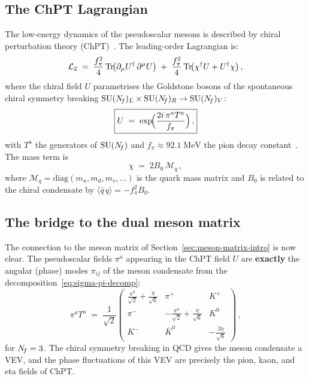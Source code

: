 \documentclass[11pt,a4paper]{article}
\newcommand{\fpi}{f_\pi}
\newcommand{\qqbar}{\langle \bar{q}\,q \rangle}
\newcommand{\ChPT}{\ensuremath{\mathrm{ChPT}}}
\begin{document}
\subsection{The ChPT Lagrangian}

The low-energy dynamics of the pseudoscalar mesons is described by
chiral perturbation theory (\ChPT)~\cite{GasserLeutwyler1984,
GasserLeutwyler1985}.  The leading-order Lagrangian is:
\begin{equation}\label{eq:chpt-L2}
  \mathcal{L}_2
  \;=\; \frac{\fpi^2}{4}\,\Tr\!\bigl(\partial_\mu U^\dagger\,
    \partial^\mu U\bigr)
  \;+\; \frac{\fpi^2}{4}\,\Tr\!\bigl(\chi^\dagger U + U^\dagger \chi\bigr)\,,
\end{equation}
where the chiral field $U$ parametrises the Goldstone bosons of the
spontaneous chiral symmetry breaking
$\mathrm{SU}(N_{\!f})_L \times \mathrm{SU}(N_{\!f})_R \to \mathrm{SU}(N_{\!f})_V$:
\begin{equation}\label{eq:U-field}
  \boxed{
  U \;=\; \exp\!\Bigl(\frac{2i\,\pi^a T^a}{\fpi}\Bigr)\,,
  }
\end{equation}
with $T^a$ the generators of $\mathrm{SU}(N_{\!f})$ and $\fpi \approx 92.1\;\text{MeV}$
the pion decay constant~\cite{PDG2024}.  The mass term is
\begin{equation}\label{eq:chi}
  \chi \;=\; 2 B_0\, \mathcal{M}_q\,,
\end{equation}
where $\mathcal{M}_q = \mathrm{diag}(m_u, m_d, m_s, \ldots)$ is the
quark mass matrix and $B_0$ is related to the chiral condensate by
$\qqbar = -\fpi^2 B_0$.


\subsection{The bridge to the dual meson matrix}

The connection to the meson matrix of Section~\ref{sec:meson-matrix-intro}
is now clear.  The pseudoscalar fields $\pi^a$ appearing in the ChPT
field $U$ are \textbf{exactly} the angular (phase) modes $\pi_{ij}$ of
the meson condensate from the decomposition~\eqref{eq:sigma-pi-decomp}:
\begin{equation}\label{eq:bridge}
  \pi^a T^a
  \;=\; \frac{1}{\sqrt{2}}
  \begin{pmatrix}
    \frac{\pi^0}{\sqrt{2}} + \frac{\eta}{\sqrt{6}} & \pi^+ & K^+ \\
    \pi^- & -\frac{\pi^0}{\sqrt{2}} + \frac{\eta}{\sqrt{6}} & K^0 \\
    K^- & \bar{K}^0 & -\frac{2\eta}{\sqrt{6}}
  \end{pmatrix}\,,
\end{equation}
for $N_{\!f} = 3$.  The chiral symmetry breaking in QCD gives the meson
condensate a VEV, and the phase fluctuations of this VEV are precisely
the pion, kaon, and eta fields of ChPT.
\end{document}
